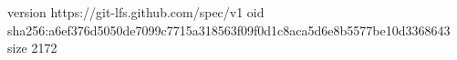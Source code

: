 version https://git-lfs.github.com/spec/v1
oid sha256:a6ef376d5050de7099c7715a318563f09f0d1c8aca5d6e8b5577be10d3368643
size 2172
